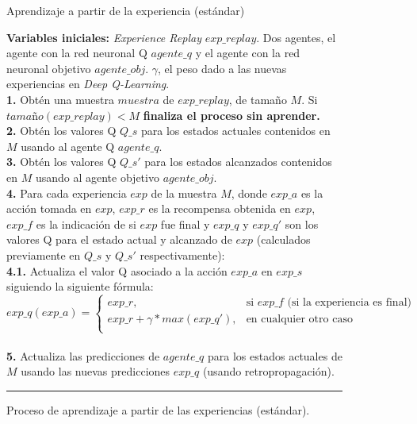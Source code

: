 \begin{figure}
\begin{algorithm}[H]
\caption{Aprendizaje a partir de la experiencia (estándar)}
\textbf{Variables iniciales:} \textit{Experience Replay} $exp\_replay$. Dos agentes, el agente con la red neuronal Q $agente\_q$ y el agente con la red neuronal objetivo $agente\_obj$. $\gamma$, el peso dado a las nuevas experiencias en \textit{Deep Q-Learning}.\\
\textbf{1.} Obtén una muestra $muestra$ de $exp\_replay$, de tamaño $M$. Si $tamaño(exp\_replay) < M$ \textbf{finaliza el proceso sin aprender.}\\
\textbf{2.} Obtén los valores Q $Q\_s$ para los estados actuales contenidos en $M$ usando al agente Q $agente\_q$.\\
\textbf{3.} Obtén los valores Q $Q\_s'$ para los estados alcanzados contenidos en $M$ usando al agente objetivo $agente\_obj$.\\
\textbf{4.} Para cada experiencia $exp$ de la muestra $M$, donde $exp\_a$ es la acción tomada en $exp$, $exp\_r$ es la recompensa obtenida en $exp$, $exp\_f$ es la indicación de si $exp$ fue final y $exp\_q$ y $exp\_q'$ son los valores Q para el estado actual y alcanzado de $exp$ (calculados previamente en $Q\_s$ y $Q\_s'$ respectivamente):\\
\Indp \textbf{4.1.} Actualiza el valor Q asociado a la acción $exp\_a$ en $exp\_s$ siguiendo la siguiente fórmula:
\[
exp\_q(exp\_a)=
\begin{cases}
	exp\_r,& \text{si } exp\_f \text{ (si la experiencia es final)}\\
	exp\_r + \gamma * max(exp\_q'),& \text{en cualquier otro caso}\\
\end{cases}
\]\\
\Indm \textbf{5.} Actualiza las predicciones de $agente\_q$ para los estados actuales de $M$ usando las nuevas predicciones $exp\_q$ (usando retropropagación).\\
\end{algorithm}
\hrule
\caption{Proceso de aprendizaje a partir de las experiencias (estándar).}
\label{alg:chap5-apst}
\end{figure}

